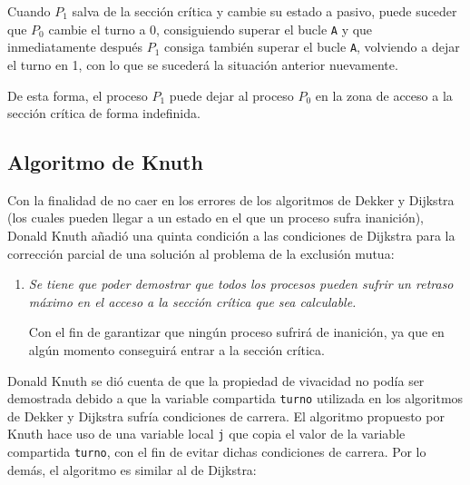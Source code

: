 \begin{description}
        Cuando $P_1$ salva de la sección crítica y cambie su estado a pasivo, puede suceder que $P_0$ cambie el turno a 0, consiguiendo superar el bucle \verb|A| y que inmediatamente después $P_1$ consiga también superar el bucle \verb|A|, volviendo a dejar el turno en 1, con lo que se sucederá la situación anterior nuevamente.

        De esta forma, el proceso $P_1$ puede dejar al proceso $P_0$ en la zona de acceso a la sección crítica de forma indefinida.
\end{description}

\subsection{Algoritmo de Knuth}
Con la finalidad de no caer en los errores de los algoritmos de Dekker y Dijkstra (los cuales pueden llegar a un estado en el que un proceso sufra inanición), Donald Knuth añadió una quinta condición a las condiciones de Dijkstra para la corrección parcial de una solución al problema de la exclusión mutua:
\begin{enumerate}[label=5.]
    \item \textit{Se tiene que poder demostrar que todos los procesos pueden sufrir un retraso máximo en el acceso a la sección crítica que sea calculable.}

        Con el fin de garantizar que ningún proceso sufrirá de inanición, ya que en algún momento conseguirá entrar a la sección crítica.
\end{enumerate}

Donald Knuth se dió cuenta de que la propiedad de vivacidad no podía ser demostrada debido a que la variable compartida \verb|turno| utilizada en los algoritmos de Dekker y Dijkstra sufría condiciones de carrera. El algoritmo propuesto por Knuth hace uso de una variable local \verb|j| que copia el valor de la variable compartida \verb|turno|, con el fin de evitar dichas condiciones de carrera. Por lo demás, el algoritmo es similar al de Dijkstra:

